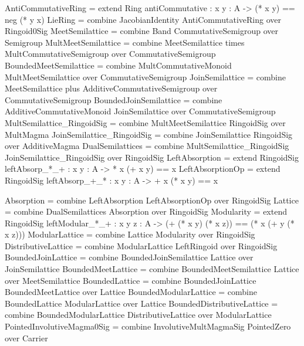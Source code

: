 \begin{togcode} 
AntiCommutativeRing = 
  extend Ring {antiCommutative : {x y : A} -> (* x y) == neg (* y x)} 
LieRing = 
  combine JacobianIdentity {} AntiCommutativeRing {} over Ringoid0Sig 
MeetSemilattice = combine Band {} CommutativeSemigroup {} over Semigroup
MultMeetSemilattice = 
  combine MeetSemilattice times MultCommutativeSemigroup {} 
  over CommutativeSemigroup
BoundedMeetSemilattice = 
  combine MultCommutativeMonoid {} MultMeetSemilattice {} 
  over CommutativeSemigroup
JoinSemilattice = 
  combine MeetSemilattice plus AdditiveCommutativeSemigroup {} 
  over CommutativeSemigroup
BoundedJoinSemilattice = 
  combine AdditiveCommutativeMonoid {} JoinSemilattice {} 
  over CommutativeSemigroup
MultSemilattice_RingoidSig = 
  combine MultMeetSemilattice {} RingoidSig {} over MultMagma
JoinSemilattice_RingoidSig = 
  combine JoinSemilattice {} RingoidSig {} over AdditiveMagma
DualSemilattices = 
  combine MultSemilattice_RingoidSig {} JoinSemilattice_RingoidSig {} 
  over RingoidSig
LeftAbsorption = 
  extend RingoidSig {leftAbsorp_*_+ : {x y : A} -> * x (+ x y) == x}
LeftAbsorptionOp = 
  extend RingoidSig {leftAbsorp_+_* : {x y : A} -> + x (* x y) == x}  
\end{togcode} 

\begin{togcode} 
Absorption = 
  combine LeftAbsorption {} LeftAbsorptionOp {} over RingoidSig
Lattice = combine DualSemilattices {} Absorption {} over RingoidSig
Modularity = 
  extend RingoidSig { leftModular_*_+ : {x y z : A} -> 
       (+ (* x y) (* x z)) == (* x (+ y (* x z))) }
ModularLattice = combine Lattice {} Modularity {} over RingoidSig
DistributiveLattice = 
  combine ModularLattice {} LeftRingoid {} over RingoidSig
BoundedJoinLattice = 
  combine BoundedJoinSemilattice {} Lattice {} over JoinSemilattice
BoundedMeetLattice = 
  combine BoundedMeetSemilattice {} Lattice {} over MeetSemilattice
BoundedLattice = 
  combine BoundedJoinLattice {} BoundedMeetLattice {} over Lattice
BoundedModularLattice = 
  combine BoundedLattice {} ModularLattice {} over Lattice
BoundedDistributiveLattice = 
  combine BoundedModularLattice {} DistributiveLattice {} 
  over ModularLattice
PointedInvolutiveMagma0Sig = 
  combine InvolutiveMultMagmaSig {} PointedZero {} over Carrier
\end{togcode} 

